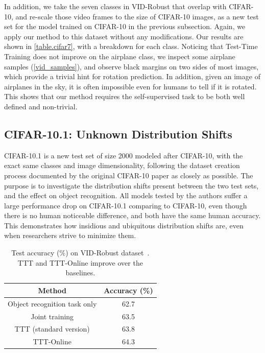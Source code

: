 In addition, we take the seven classes in VID-Robust that overlap with CIFAR-10, and re-scale those video frames to the size of CIFAR-10 images, as a new test set for the model trained on CIFAR-10 in the previous subsection. Again, we apply our method to this dataset without any modifications.
Our results are shown in \autoref{table.cifar7}, with a breakdown for each class. 
Noticing that Test-Time Training does not improve on the airplane class, we inspect some airplane samples (\autoref{vid_samples}), and observe black margins on two sides of most images, which provide a trivial hint for rotation prediction. 
In addition, given an image of airplanes in the sky, it is often impossible even for humans to tell if it is rotated.
This shows that our method requires the self-supervised task to be both well defined and non-trivial.

\subsection{CIFAR-10.1: Unknown Distribution Shifts}
\label{cifar10_new}
CIFAR-10.1 \citep{recht2018cifar} is a new test set of size 2000 modeled after CIFAR-10, with the exact same classes and image dimensionality, following the dataset creation process documented by the original CIFAR-10 paper as closely as possible.
The purpose is to investigate the distribution shifts present between the two test sets, and the effect on object recognition.
All models tested by the authors suffer a large performance drop on CIFAR-10.1 comparing to CIFAR-10,
even though there is no human noticeable difference, and both have the same human accuracy.
This demonstrates how insidious and ubiquitous distribution shifts are, even when researchers strive to minimize them.

\begin{table}
	\vspace{-1ex}
	\begin{center}{
			\begin{tabular}{c|c}  \toprule
				Method 									& Accuracy (\%) \\	\midrule
				{\small Object recognition task only} 								& 62.7\\  \midrule
				{\small Joint training {\scriptsize \citep{hendrycks2019using}}}						& 63.5\\  \midrule
				TTT	(standard version)	& 63.8\\  \midrule
				TTT-Online		& 64.3\\  \bottomrule
			\end{tabular}
			\caption{Test accuracy (\%) on VID-Robust dataset~\cite{shankar2019systematic}. 
			TTT and TTT-Online improve over the baselines.
			}\label{vidtable}
	}\end{center}
\end{table} 


